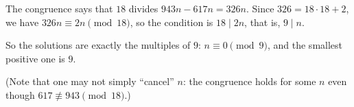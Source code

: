 The congruence says that $18$ divides $943n-617n=326n$. Since $326=18\cdot18+2$, we have $326n\equiv2n\pmod{18}$, so the condition is $18\mid2n$, that is, $9\mid n$.

So the solutions are exactly the multiples of $9$: $n\equiv0\pmod 9$, and the smallest positive one is $\boxed{9}$.

(Note that one may not simply ``cancel'' $n$: the congruence holds for some $n$ even though $617\not\equiv943\pmod{18}$.)
